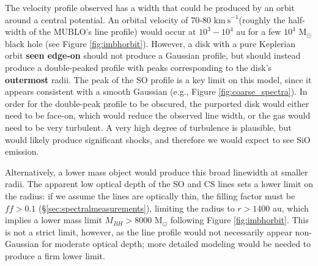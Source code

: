 \documentclass[]{aastex631}
\newcommand{\msun}{\ensuremath{\mathrm{M}_\odot}\xspace}
\newcommand{\kms}{\ensuremath{\mathrm{km~s}^{-1}}\xspace}
\def\rr#1{\textbf{#1}}
\begin{document}
The velocity profile observed has a width that could be produced by an orbit around a central potential.
An orbital velocity of 70-80 \kms (roughly the half-width of the MUBLO's line profile) would occur at $10^3-10^4$ au for a few $10^4$ \msun black hole (see Figure \ref{fig:imbhorbit}).
However, a disk with a pure Keplerian orbit \rr{seen edge-on} should not produce a Gaussian profile, but should instead produce a double-peaked profile with peaks corresponding to the disk's \rr{outermost} radii.
The peak of the SO profile is a key limit on this model, since it appears consistent with a smooth Gaussian (e.g., Figure \ref{fig:coarse_spectra}).
In order for the double-peak profile to be obscured, the purported disk would either need to be face-on, which would reduce the observed line width, or the gas would need to be very turbulent.
A very high degree of turbulence is plausible, but would likely produce significant shocks, and therefore we would expect to see SiO emission.

Alternatively, a lower mass object would produce this broad linewidth at smaller radii.
The apparent low optical depth of the SO and CS lines sets a lower limit on the radius: if we assume the lines are optically thin, the filling factor must be $ff>0.1$ (\S \ref{sec:spectralmeasurements}), limiting the radius to $r>1400$ au, which implies a lower mass limit $M_{BH}>8000$ \msun following Figure \ref{fig:imbhorbit}.
This is not a strict limit, however, as the line profile would not necessarily appear non-Gaussian for moderate optical depth; more detailed modeling would be needed to produce a firm lower limit.


\end{document}
